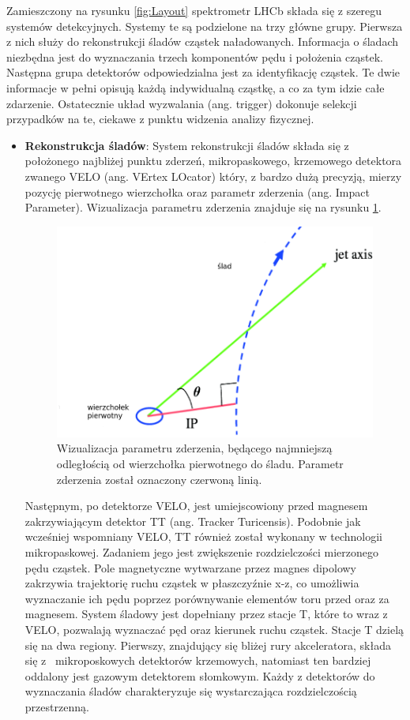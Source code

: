 Zamieszczony na rysunku \ref{fig:Layout} spektrometr LHCb składa się z szeregu systemów detekcyjnych. Systemy te są podzielone na trzy główne grupy. Pierwsza z nich służy do  rekonstrukcji śladów cząstek naładowanych. Informacja o śladach niezbędna jest do wyznaczania trzech komponentów pędu i położenia cząstek. Następna grupa detektorów odpowiedzialna jest za identyfikację cząstek. Te dwie informacje w pełni opisują każdą indywidualną cząstkę, a co za tym idzie całe zdarzenie. Ostatecznie układ wyzwalania (ang. trigger) dokonuje selekcji przypadków na te, ciekawe z punktu widzenia analizy fizycznej. 
\begin{itemize}
\item \textbf{Rekonstrukcja śladów}: System rekonstrukcji śladów składa się z położonego najbliżej punktu zderzeń, mikropaskowego, krzemowego detektora zwanego VELO (ang. VErtex LOcator) który, z  bardzo dużą precyzją,   mierzy pozycję pierwotnego wierzchołka oraz parametr zderzenia (ang. Impact Parameter). Wizualizacja parametru zderzenia znajduje się na rysunku \ref{fig:IP}.
\begin{figure}[th] 
  \centering
  \includegraphics[scale=0.5]{rozdzial2/impactParameter.png}
  \caption{Wizualizacja parametru zderzenia, będącego najmniejszą odległością od wierzchołka pierwotnego do śladu. Parametr zderzenia został oznaczony czerwoną linią. }
  \label{fig:IP}
\end{figure}

Następnym, po detektorze VELO, jest umiejscowiony przed magnesem zakrzywiającym detektor TT (ang. Tracker Turicensis). Podobnie jak wcześniej wspomniany VELO, TT również został wykonany w technologii mikropaskowej. Zadaniem jego jest zwiększenie rozdzielczości mierzonego pędu cząstek. Pole magnetyczne wytwarzane przez magnes dipolowy zakrzywia trajektorię ruchu cząstek w płaszczyźnie x-z, co umożliwia wyznaczanie ich pędu poprzez porównywanie elementów toru przed oraz za magnesem. System śladowy jest dopełniany przez stacje T, które to wraz z VELO, pozwalają wyznaczać pęd oraz kierunek ruchu cząstek. Stacje T dzielą się na dwa regiony. Pierwszy, znajdujący się bliżej rury akceleratora, składa się z~ mikroposkowych detektorów krzemowych, natomiast ten bardziej oddalony jest  gazowym detektorem słomkowym.
Każdy z detektorów do wyznaczania śladów charakteryzuje się wystarczająca rozdzielczością przestrzenną. 


\end{itemize}
